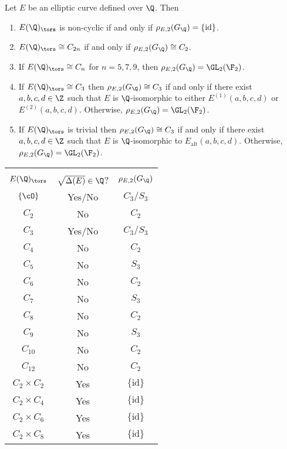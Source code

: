 \begin{thm} %
Let $E$ be an elliptic curve defined over $\Q$. Then
	\begin{enumerate}[(1)]
	\item $E(\Q)_\tors$ is non-cyclic if and only if $\rho_{E,2}(G_\Q)= \{\text{id}\}$.
	\item $E(\Q)_\tors \cong C_{2n}$ if and only if $\rho_{E,2}(G_\Q) \cong C_2$.
	\item If $E(\Q)_\tors \cong C_n$ for $n= 5,7,9$, then $\rho_{E,2}(G_\Q)= \GL_2(\F_2)$.
	\item If $E(\Q)_\tors \cong C_3$ then $\rho_{E,2}(G_\Q) \cong C_3$ if and only if there exist $a,b,c,d \in \Z$ such that $E$ is $\Q$-isomorphic to either $E^{(1)}(a,b,c,d)$ or $E^{(2)}(a,b,c,d)$. Otherwise, $\rho_{E,2}(G_\Q)= \GL_2(\F_2)$. 
	\item If $E(\Q)_\tors$ is trivial then $\rho_{E,2}(G_\Q) \cong C_3$ if and only if there exist $a,b,c,d \in \Z$ such that $E$ is $\Q$-isomorphic to $E_{\text{alt}}(a,b,c,d)$. Otherwise, $\rho_{E,2}(G_\Q)= \GL_2(\F_2)$.
	\end{enumerate}
\end{thm}


	\begin{table}[!ht]
	\centering
	\begin{tabular}{c|c|c} \hline \\[-0.4cm]
	$E(\Q)_\tors$ & $\sqrt{\Delta(E)} \in \Q$? & $\rho_{E,2}(G_\Q)$ \\[0.1cm] \hline
	$\{\cO\}$ & Yes/No & $C_3/S_3$ \\
	$C_2$ & No & $C_2$ \\
	$C_3$ & Yes/No & $C_3/S_3$ \\
	$C_4$ & No & $C_2$ \\
	$C_5$ & No & $S_3$ \\
	$C_6$ & No & $C_2$ \\
	$C_7$ & No & $S_3$ \\
	$C_8$ & No & $C_2$ \\
	$C_9$ & No & $S_3$ \\
	$C_{10}$ & No & $C_2$ \\
	$C_{12}$ & No & $C_2$ \\
	$C_2 \times C_2$ & Yes & $\{\text{id}\}$ \\
	$C_2 \times C_4$ & Yes & $\{\text{id}\}$ \\
	$C_2 \times C_6$ & Yes & $\{\text{id}\}$ \\
	$C_2 \times C_8$ & Yes & $\{\text{id}\}$
	\end{tabular}
	\end{table}



